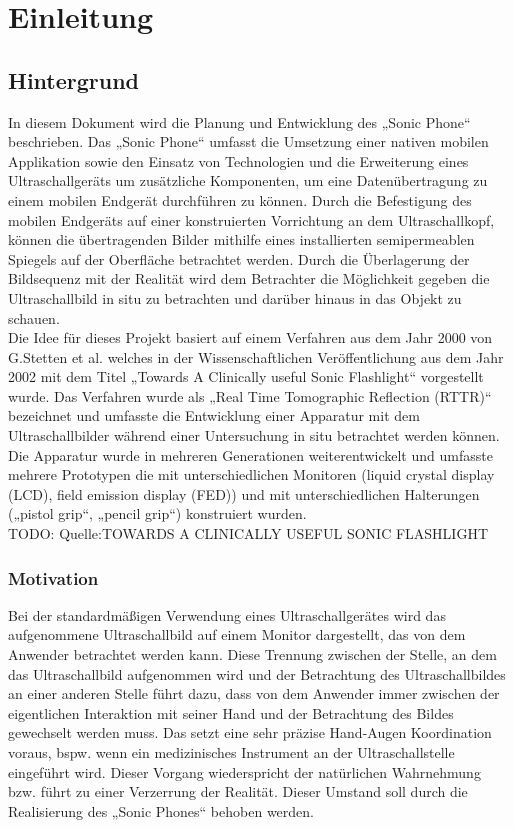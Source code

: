 \chapter{Einleitung}
\section{Hintergrund}
In diesem Dokument wird die Planung und Entwicklung des „Sonic Phone“ beschrieben. Das „Sonic Phone“ umfasst die Umsetzung einer nativen mobilen Applikation sowie den Einsatz von Technologien und die Erweiterung eines Ultraschallgeräts um zusätzliche Komponenten, um eine Datenübertragung zu einem mobilen Endgerät durchführen zu können. Durch die Befestigung des mobilen Endgeräts auf einer konstruierten Vorrichtung an dem Ultraschallkopf, können die übertragenden Bilder mithilfe eines installierten semipermeablen Spiegels auf der Oberfläche betrachtet werden.  Durch die Überlagerung der Bildsequenz mit der Realität wird dem Betrachter die Möglichkeit gegeben die Ultraschallbild in situ zu betrachten und darüber hinaus in das Objekt zu schauen.\\
Die Idee für dieses Projekt basiert auf einem Verfahren aus dem Jahr 2000 von G.Stetten et al. welches in der Wissenschaftlichen Veröffentlichung aus dem Jahr 2002 mit dem Titel „Towards A Clinically useful Sonic Flashlight“ vorgestellt wurde. Das Verfahren wurde als „Real Time Tomographic Reflection (RTTR)“ bezeichnet und umfasste die Entwicklung einer Apparatur mit dem Ultraschallbilder während einer Untersuchung in situ  betrachtet werden können. Die Apparatur wurde in mehreren Generationen weiterentwickelt und umfasste mehrere Prototypen die mit unterschiedlichen Monitoren (liquid crystal display (LCD), field emission display (FED)) und mit unterschiedlichen Halterungen („pistol grip“, „pencil grip“) konstruiert wurden. \\
TODO: Quelle:TOWARDS A CLINICALLY USEFUL SONIC FLASHLIGHT

\subsection{Motivation}
Bei der standardmäßigen Verwendung eines Ultraschallgerätes wird das aufgenommene Ultraschallbild auf einem Monitor dargestellt, das von dem Anwender betrachtet werden kann. Diese Trennung zwischen der Stelle, an dem das Ultraschallbild aufgenommen wird und der Betrachtung des Ultraschallbildes an einer anderen Stelle führt dazu, dass von dem Anwender immer zwischen der eigentlichen Interaktion mit seiner Hand und der Betrachtung des Bildes gewechselt werden muss. Das setzt eine sehr präzise Hand-Augen Koordination voraus, bspw. wenn ein medizinisches Instrument an der Ultraschallstelle eingeführt wird. Dieser Vorgang wiederspricht der natürlichen Wahrnehmung bzw. führt zu einer Verzerrung der Realität. Dieser Umstand soll durch die Realisierung des „Sonic Phones“ behoben werden.
